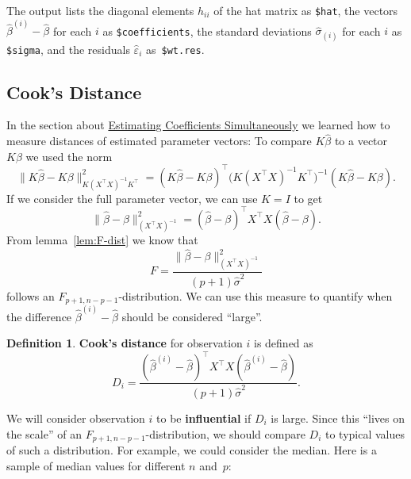 \documentclass[
  a4paper,
]{article}
\theoremstyle{definition}
\newtheorem{definition}{Definition}[section]
\theoremstyle{definition}
\theoremstyle{definition}
\theoremstyle{definition}
\theoremstyle{remark}
\begin{document}
The output lists the diagonal elements \(h_{ii}\) of the hat matrix
as \texttt{\$hat}, the vectors \(\hat\beta^{(i)} - \hat\beta\) for each \(i\)
as \texttt{\$coefficients}, the standard deviations \(\hat\sigma_{(i)}\)
for each \(i\) as \texttt{\$sigma}, and the residuals \(\hat\varepsilon_i\) as~\texttt{\$wt.res}.

\hypertarget{influence}{%
\subsection{Cook's Distance}\label{influence}}

In the section about \protect\hyperlink{S06-simultaneous}{Estimating Coefficients Simultaneously} we learned
how to measure distances of estimated parameter vectors: To compare
\(K\hat\beta\) to a vector \(K\beta\) we used the norm
\begin{equation*}
  \bigl\| K\hat\beta - K\beta \bigr\|_{K(X^\top X)^{-1}K^\top}^2
  = (K\hat\beta - K\beta)^\top \bigl(K(X^\top X)^{-1}K^\top\bigr)^{-1} (K\hat\beta - K\beta).
\end{equation*}
If we consider the full parameter vector, we can use \(K = I\) to get
\begin{equation*}
  \bigl\| \hat\beta - \beta \bigr\|_{(X^\top X)^{-1}}^2
  = (\hat\beta - \beta)^\top X^\top X (\hat\beta - \beta).
\end{equation*}
From lemma~\ref{lem:F-dist} we know that
\begin{equation*}
  F = \frac{\bigl\| \hat\beta - \beta \bigr\|_{(X^\top X)^{-1}}^2}{(p+1)\hat\sigma^2}
\end{equation*}
follows an \(F_{p+1, n-p-1}\)-distribution. We can use this measure to
quantify when the difference \(\hat\beta^{(i)} - \hat\beta\) should be
considered ``large''.

\begin{definition}
\protect\hypertarget{def:Cook-D}{}\label{def:Cook-D}\textbf{Cook's distance} for observation \(i\) is defined as
\begin{equation*}
  D_i
  = \frac{(\hat\beta^{(i)} - \hat\beta)^\top X^\top X (\hat\beta^{(i)} - \hat\beta)}{(p+1)\hat\sigma^2}.
\end{equation*}
\end{definition}

We will consider observation \(i\) to be \textbf{influential} if \(D_i\) is large.
Since this ``lives on the scale'' of an \(F_{p+1, n-p-1}\)-distribution,
we should compare \(D_i\) to typical values of such a distribution. For
example, we could consider the median. Here is a sample of median values
for different \(n\) and~\(p\):
\end{document}
